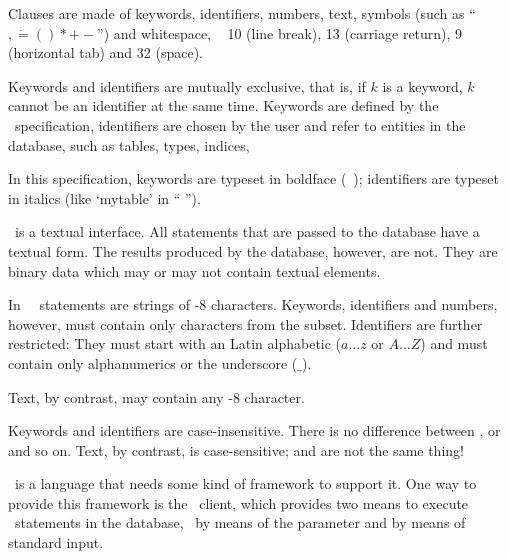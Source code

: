 Clauses are made of keywords, identifiers, numbers, text,
symbols (such as ``$, \dot = ( ) * + -$'') and
whitespace, \ie\ 
10 (line break),
13 (carriage return),
9  (horizontal tab)
and 32 (space).

Keywords and identifiers are mutually
exclusive, that is, if $k$ is a keyword,
$k$ cannot be an identifier at the same time.
Keywords are defined by the \sql\ specification,
identifiers are chosen by the user
and refer to entities in the database,
such as tables, types, indices, \etc\

In this specification,
keywords are typeset in boldface
(\eg\ );
identifiers are typeset in italics
(like `mytable' in 
`` '').

\sql\ is a textual interface.
All statements that are passed to the database
have a textual form. The results produced
by the database, however, are not. They are
binary data which may or may not
contain textual elements.

In \nowdb\ \sql\ statements are strings
of -8 characters.
Keywords, identifiers and numbers, however,
must contain only characters
from the  subset.
Identifiers are further restricted:
They must start with an  
Latin alphabetic ($a\dots z$ or $A \dots Z$)
and must contain only
alphanumerics or the underscore ($\_$).

Text, by contrast, may contain any
-8 character.

Keywords and identifiers are case-insensitive.
There is no difference between
,  or 
and so on.
Text, by contrast, is case-sensitive;
 and 
are not the same thing!

\sql\ is a  language
that needs some kind of framework
to support it. One way to provide this
framework is the \nowdb\ client,
which provides two means to execute
\sql\ statements in the database,
\ie\ by means of the  parameter
and by means of standard input.

